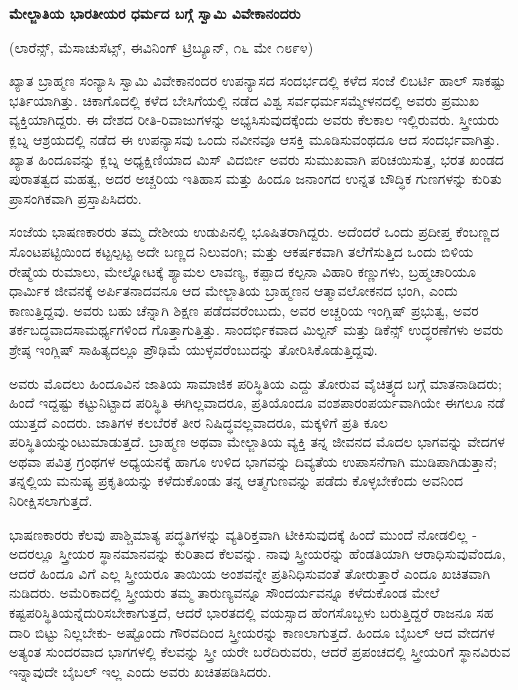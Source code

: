 \begin{center}
\textbf{ಮೇಲ್ಜಾತಿಯ ಭಾರತೀಯರ ಧರ್ಮದ ಬಗ್ಗೆ ಸ್ವಾಮಿ ವಿವೇಕಾನಂದರು}
\end{center}

\begin{center}
(ಲಾರೆನ್ಸ್, ಮೆಸಾಚುಸೆಟ್ಸ್, ಈವಿನಿಂಗ್ ಟ್ರಿಬ್ಯೂನ್, ೧೬ ಮೇ ೧೮೯೪)
\end{center}

ಖ್ಯಾತ ಬ್ರಾಹ್ಮಣ ಸಂನ್ಯಾಸಿ ಸ್ವಾಮಿ ವಿವೇಕಾನಂದರ ಉಪನ್ಯಾಸದ ಸಂದರ್ಭದಲ್ಲಿ ಕಳೆದ ಸಂಜೆ ಲಿಬರ್ಟಿ ಹಾಲ್ ಸಾಕಷ್ಟು ಭರ್ತಿಯಾಗಿತ್ತು. ಚಿಕಾಗೊದಲ್ಲಿ ಕಳೆದ ಬೇಸಿಗೆಯಲ್ಲಿ ನಡೆದ ವಿಶ್ವ ಸರ್ವಧರ್ಮಸಮ್ಮೇಳನದಲ್ಲಿ ಅವರು ಪ್ರಮುಖ ವ್ಯಕ್ತಿಯಾಗಿದ್ದರು. ಈ ದೇಶದ ರೀತಿ-ರಿವಾಜುಗಳನ್ನು ಅಭ್ಯಸಿಸುವುದಕ್ಕೆಂದು ಅವರು ಕೆಲಕಾಲ ಇಲ್ಲಿರುವರು. ಸ್ತ್ರೀಯರು ಕ್ಲಬ್ನ ಆಶ್ರಯದಲ್ಲಿ ನಡೆದ ಈ ಉಪನ್ಯಾಸವು ಒಂದು ನವೀನವೂ ಆಸಕ್ತಿ ಮೂಡಿಸುವಂಥದೂ ಆದ ಸಂದರ್ಭವಾಗಿತ್ತು. ಖ್ಯಾತ ಹಿಂದೂವನ್ನು ಕ್ಲಬ್ನ ಅಧ್ಯಕ್ಷಿಣಿಯಾದ ಮಿಸ್ ವಿದರ್ಬೀ ಅವರು ಸುಮುಖವಾಗಿ ಪರಿಚಯಿಸುತ್ತ, ಭರತ ಖಂಡದ ಪುರಾತತ್ವದ ಮಹತ್ವ, ಅದರ ಅಚ್ಚರಿಯ ಇತಿಹಾಸ ಮತ್ತು ಹಿಂದೂ ಜನಾಂಗದ ಉನ್ನತ ಬೌದ್ಧಿಕ ಗುಣಗಳನ್ನು ಕುರಿತು ಪ್ರಾಸಂಗಿಕವಾಗಿ ಪ್ರಸ್ತಾಪಿಸಿದರು.

ಸಂಜೆಯ ಭಾಷಣಕಾರರು ತಮ್ಮ ದೇಶೀಯ ಉಡುಪಿನಲ್ಲಿ ಭೂಷಿತರಾಗಿದ್ದರು. ಅದೆಂದರೆ ಒಂದು ಪ್ರದೀಪ್ತ ಕೆಂಬಣ್ಣದ ಸೊಂಟಪಟ್ಟಿಯಿಂದ ಕಟ್ಟಲ್ಪಟ್ಟ ಅದೇ ಬಣ್ಣದ ನಿಲುವಂಗಿ; ಮತ್ತು ಆಕರ್ಷಕವಾಗಿ ತಲೆಗೆಸುತ್ತಿದ ಒಂದು ಬಿಳಿಯ ರೇಷ್ಮೆಯ ರುಮಾಲು, ಮೇಲ್ನೋಟಕ್ಕೆ ಶ್ಯಾಮಲ ಲಾವಣ್ಯ, ಕಪ್ಪಾದ ಕಲ್ಪನಾ ವಿಹಾರಿ ಕಣ್ಣುಗಳು, ಬ್ರಹ್ಮಚಾರಿಯೂ ಧಾರ್ಮಿಕ ಜೀವನಕ್ಕೆ ಅರ್ಪಿತನಾದವನೂ ಆದ ಮೇಲ್ಜಾತಿಯ ಬ್ರಾಹ್ಮಣನ ಆತ್ಮಾವಲೋಕನದ ಭಂಗಿ, ಎಂದು ಕಾಣುತ್ತಿದ್ದವು. ಅವರು ಬಹು ಚೆನ್ನಾಗಿ ಶಿಕ್ಷಣ ಪಡೆದವರೆಂಬುದು, ಅವರ ಅಚ್ಚರಿಯ ಇಂಗ್ಲಿಷ್ ಪ್ರಭುತ್ವ, ಅವರ ತರ್ಕಬದ್ಧವಾದಸಾಮರ್ಥ್ಯಗಳಿಂದ ಗೊತ್ತಾಗುತ್ತಿತ್ತು. ಸಾಂದರ್ಭಿಕವಾದ ಮಿಲ್ಟನ್ ಮತ್ತು ಡಿಕೆನ್ಸ್ ಉದ್ಧರಣೆಗಳು ಅವರು ಶ್ರೇಷ್ಠ ಇಂಗ್ಲಿಷ್ ಸಾಹಿತ್ಯದಲ್ಲೂ ಪ್ರೌಢಿಮೆ ಯುಳ್ಳವರೆಂಬುದನ್ನು ತೋರಿಸಿಕೊಡುತ್ತಿದ್ದವು.

ಅವರು ಮೊದಲು ಹಿಂದೂವಿನ ಜಾತಿಯ ಸಾಮಾಜಿಕ ಪರಿಸ್ಥಿತಿಯ ಎದ್ದು ತೋರುವ ವೈಚಿತ್ರ್ಯದ ಬಗ್ಗೆ ಮಾತನಾಡಿದರು; ಹಿಂದೆ ಇದ್ದಷ್ಟು ಕಟ್ಟುನಿಟ್ಟಾದ ಪರಿಸ್ಥಿತಿ ಈಗಿಲ್ಲವಾದರೂ, ಪ್ರತಿಯೊಂದೂ ವಂಶಪಾರಂಪರ್ಯವಾಗಿಯೇ ಈಗಲೂ ನಡೆ ಯುತ್ತದೆ ಎಂದರು. ಜಾತಿಗಳ ಕಲಬೆರಕೆ ತೀರ ನಿಷಿದ್ಧವಲ್ಲವಾದರೂ, ಮಕ್ಕಳಿಗೆ ಪ್ರತಿ ಕೂಲ ಪರಿಸ್ಥಿತಿಯನ್ನುಂಟುಮಾಡುತ್ತದೆ. ಬ್ರಾಹ್ಮಣ ಅಥವಾ ಮೇಲ್ಜಾತಿಯ ವ್ಯಕ್ತಿ ತನ್ನ ಜೀವನದ ಮೊದಲ ಭಾಗವನ್ನು ವೇದಗಳ ಅಥವಾ ಪವಿತ್ರ ಗ್ರಂಥಗಳ ಅಧ್ಯಯನಕ್ಕೆ ಹಾಗೂ ಉಳಿದ ಭಾಗವನ್ನು ದಿವ್ಯತೆಯ ಉಪಾಸನೆಗಾಗಿ ಮುಡಿಪಾಗಿಡುತ್ತಾನೆ; ತನ್ನಲ್ಲಿಯ ಮನುಷ್ಯ ಪ್ರಕೃತಿಯನ್ನು ಕಳೆದುಕೊಂಡು ತನ್ನ ಆತ್ಮಗುಣವನ್ನು ಪಡೆದು ಕೊಳ್ಳಬೇಕೆಂದು ಅವನಿಂದ ನಿರೀಕ್ಷಿಸಲಾಗುತ್ತದೆ.

ಭಾಷಣಕಾರರು ಕೆಲವು ಪಾಶ್ಚಿಮಾತ್ಯ ಪದ್ಧತಿಗಳನ್ನು ವ್ಯತಿರಿಕ್ತವಾಗಿ ಟೀಕಿಸುವುದಕ್ಕೆ ಹಿಂದೆ ಮುಂದೆ ನೋಡಲಿಲ್ಲ - ಅದರಲ್ಲೂ ಸ್ತ್ರೀಯರ ಸ್ಥಾನಮಾನವನ್ನು ಕುರಿತಾದ ಕೆಲವನ್ನು. ನಾವು ಸ್ತ್ರೀಯರನ್ನು ಹೆಂಡತಿಯಾಗಿ ಆರಾಧಿಸುವುವೆಂದೂ, ಆದರೆ ಹಿಂದೂ ವಿಗೆ ಎಲ್ಲ ಸ್ತ್ರೀಯರೂ ತಾಯಿಯ ಅಂಶವನ್ನೇ ಪ್ರತಿನಿಧಿಸುವಂತೆ ತೋರುತ್ತಾರೆ ಎಂದೂ ಖಚಿತವಾಗಿ ನುಡಿದರು. ಅಮೆರಿಕಾದಲ್ಲಿ ಸ್ತ್ರೀಯರು ತಮ್ಮ ತಾರುಣ್ಯವನ್ನೂ ಸೌಂದರ್ಯವನ್ನೂ ಕಳೆದುಕೊಂಡ ಮೇಲೆ ಕಷ್ಟಪರಿಸ್ಥಿತಿಯನ್ನೆದುರಿಸಬೇಕಾಗುತ್ತದೆ, ಆದರೆ ಭಾರತದಲ್ಲಿ ವಯಸ್ಸಾದ ಹೆಂಗಸೊಬ್ಬಳು ಬರುತ್ತಿದ್ದರೆ ರಾಜನೂ ಸಹ ದಾರಿ ಬಿಟ್ಟು ನಿಲ್ಲಬೇಕು- ಅಷ್ಟೊಂದು ಗೌರವದಿಂದ ಸ್ತ್ರೀಯರನ್ನು ಕಾಣಲಾಗುತ್ತದೆ. ಹಿಂದೂ ಬೈಬಲ್ ಆದ ವೇದಗಳ ಅತ್ಯಂತ ಸುಂದರವಾದ ಭಾಗಗಳಲ್ಲಿ ಕೆಲವನ್ನು ಸ್ತ್ರೀ ಯರೇ ಬರೆದಿರುವರು, ಆದರೆ ಪ್ರಪಂಚದಲ್ಲಿ ಸ್ತ್ರೀಯರಿಗೆ ಸ್ಥಾನವಿರುವ ಇನ್ನಾವುದೇ ಬೈಬಲ್ ಇಲ್ಲ ಎಂದು ಅವರು ಖಚಿತಪಡಿಸಿದರು.

